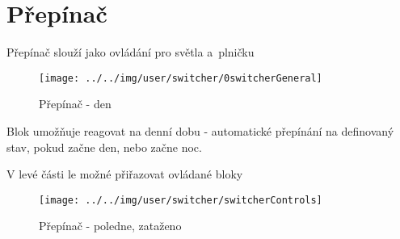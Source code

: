 
\section{Přepínač}

Přepínač slouží jako ovládání pro světla a~plničku

\begin{figure}[!ht]\centering
\texttt{[image: ../../img/user/switcher/0switcherGeneral]}

\caption{Přepínač - den}
\label{fig:user_switcher_0switcherGeneral}

\end{figure}

\FloatBarrier

Blok umožňuje reagovat na denní dobu - automatické přepínání na definovaný stav, pokud začne den, nebo začne noc.

V levé části le možné přiřazovat ovládané bloky

\begin{figure}[!ht]\centering
\texttt{[image: ../../img/user/switcher/switcherControls]}

\caption{Přepínač - poledne, zataženo}
\label{fig:user_switcher_switcherControls}

\end{figure}


\FloatBarrier